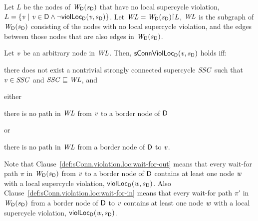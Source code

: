 \begin{definition}
\label{def:sConn.violation.loc}
\label{defn:sConn.violation.loc}

Let $L$ be the nodes of $\wfg{\dsk{a}{\l}}{\sD}$ that have no local supercycle violation, \ie
 $L = \set{ \ndv \stt \ndv \in \dsk{a}{\l} \land \neg \scVL{\ndv}{\sD}{\act}{\l} }$.
%
Let $\WL = \wfg{\dsk{a}{\l}}{\sD} \pj L$, \ie $\WL$ is the subgraph of $\wfg{\dsk{a}{\l}}{\sD}$ consisting of the
nodes with no local supercycle violation, and the edges between those nodes that are also edges in $\wfg{\dsk{a}{\l}}{\sD}$.

Let $\ndv$ be an arbitrary node in $\WL$.  Then, $\locConnViol{\ndv}{\sD}{\act}{\l}$ holds iff:
\bn

\item \label{def:sConn.violation.loc:scc}
there does not exist a nontrivial strongly connected supercycle $\SSC$ such that $v \in \SSC$ and $\SSC \subg \WL$, and


\item \label{def:sConn.violation.border}
either
    \bn

    \item \label{def:sConn.violation.loc:wait-for-out} there is no path in $\WL$ from $\ndv$ to a border node of $\dsk{a}{\l}$

     or

    \item \label{def:sConn.violation.loc:wait-for-in} there is no path in $\WL$ from  a border node of $\dsk{a}{\l}$ to $\ndv$.

    \en

\en
\end{definition}
%
Note that Clause~\ref{def:sConn.violation.loc:wait-for-out} means that 
every wait-for path $\pi$ in $\wfg{\dsk{a}{\l}}{\sD}$  from $\ndv$ to a border node
of $\dsk{a}{\l}$ contains at least one node $\ndw$ with a local supercycle violation, \ie $\scVL{\ndw}{\sD}{\act}{\l}$.
Also 
Clause~\ref{def:sConn.violation.loc:wait-for-in} means that every wait-for path $\pi'$ in $\wfg{\dsk{a}{\l}}{\sD}$ from a border node
of $\dsk{a}{\l}$ to $\ndv$ contains at least one node $\ndw$ with a local supercycle violation,  \ie $\scVL{\ndw}{\sD}{\act}{\l}$.


